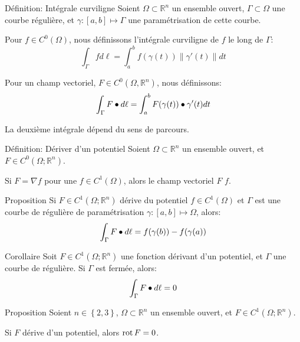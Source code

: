 \documentclass[a4paper]{article}
\begin{document}
\begin{parag}{Définition: Intégrale curviligne}
    Soient $\Omega \subset \mathbb{R}^n$ un ensemble ouvert, $\Gamma \subset \Omega$ une courbe régulière, et $\gamma : \left[a, b\right] \mapsto \Gamma$ une paramétrisation de cette courbe.

    Pour $f \in C^0\left(\Omega\right)$, nous définissons l'intégrale curviligne de $f$ le long de $\Gamma$:
    \[\int_\Gamma f d \ell = \int_{a}^{b} f\left(\gamma\left(t\right)\right) \left\|\gamma'\left(t\right)\right\| dt\]
    
    Pour un champ vectoriel, $F \in C^0\left(\Omega, \mathbb{R}^n\right)$, nous définissons: 
    \[\int_\Gamma F \dotprod d \ell = \int_{a}^{b} F\left(\gamma\left(t\right)\right) \dotprod \gamma'\left(t\right) dt\]

    La deuxième intégrale dépend du sens de parcours.
\end{parag}

\begin{parag}{Définition: Dériver d'un potentiel}
    Soient $\Omega \subset \mathbb{R}^n$ un ensemble ouvert, et $F \in C^{0}\left(\Omega;\mathbb{R}^n\right)$.

    Si $F = \nabla f$ pour une $f \in C^1\left(\Omega\right)$, alors le champ vectoriel $F$  $f$.
\end{parag}

\begin{parag}{Proposition}
    Si $F \in C^{1}\left(\Omega; \mathbb{R}^n\right)$ dérive du potentiel $f \in C^{1}\left(\Omega\right)$ et $\Gamma$ est une courbe de régulière de paramétrisation $\gamma : \left[a, b\right] \mapsto \Omega$, alors: 
    \[\int_{\Gamma} F \dotprod d \ell = f\left(\gamma\left(b\right)\right) - f\left(\gamma\left(a\right)\right)\]
\end{parag}

\begin{parag}{Corollaire}
    Soit $F \in C^{1}\left(\Omega; \mathbb{R}^n\right)$ une fonction dérivant d'un potentiel, et $\Gamma$ une courbe de régulière. Si $\Gamma$ est fermée, alors: 
    \[\int_{\Gamma} F \bullet d \ell = 0\]
\end{parag}


\begin{parag}{Proposition}
    Soient $n \in \left\{2, 3\right\}$, $\Omega \subset \mathbb{R}^n$ un ensemble ouvert, et $F \in C^1\left(\Omega; \mathbb{R}^n\right)$.

    Si $F$ dérive d'un potentiel, alors $\operatorname{rot} F = 0$.
\end{parag}
\end{document}
